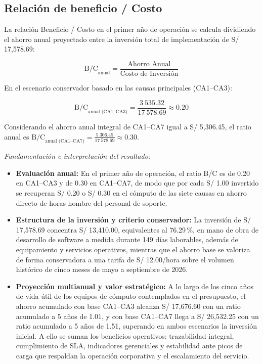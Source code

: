 \subsection{Relación de beneficio / Costo}

La relación Beneficio / Costo en el primer año de operación se calcula dividiendo el ahorro anual proyectado entre la inversión total de implementación de S/ 17,578.69:

\[
\text{B/C}_{\text{anual}} = \frac{\text{Ahorro Anual}}{\text{Costo de Inversión}}
\]

En el escenario conservador basado en las causas principales (CA1–CA3):

\[
\text{B/C}_{\text{anual (CA1–CA3)}} = \frac{3\ 535.32}{17\ 578.69} \approx 0.20
\]

Considerando el ahorro anual integral de CA1–CA7 igual a S/ 5,306.45, el ratio anual es $\text{B/C}_{\text{anual (CA1–CA7)}} = \frac{5\ 306.45}{17\ 578.69} \approx 0.30$.

\noindent\textit{Fundamentación e interpretación del resultado:}
\begin{itemize}[leftmargin=1.27cm]
    \item \textbf{Evaluación anual:} En el primer año de operación, el ratio B/C es de 0.20 en CA1–CA3 y de 0.30 en CA1–CA7, de modo que por cada S/ 1.00 invertido se recuperan S/ 0.20 o S/ 0.30 en el cómputo de las siete causas en ahorro directo de horas-hombre del personal de soporte.
    \item \textbf{Estructura de la inversión y criterio conservador:} La inversión de S/ 17,578.69 concentra S/ 13,410.00, equivalentes al 76.29\,\%, en mano de obra de desarrollo de software a medida durante 149 días laborables, además de equipamiento y servicios operativos, mientras que el ahorro base se valoriza de forma conservadora a una tarifa de S/ 12.00/hora sobre el volumen histórico de cinco meses de mayo a septiembre de 2026.
    \item \textbf{Proyección multianual y valor estratégico:} A lo largo de los cinco años de vida útil de los equipos de cómputo contemplados en el presupuesto, el ahorro acumulado con base CA1–CA3 alcanza S/ 17,676.60 con un ratio acumulado a 5 años de 1.01, y con base CA1–CA7 llega a S/ 26,532.25 con un ratio acumulado a 5 años de 1.51, superando en ambos escenarios la inversión inicial. A ello se suman los beneficios operativos: trazabilidad integral, cumplimiento de SLA, indicadores gerenciales y estabilidad ante picos de carga que respaldan la operación corporativa y el escalamiento del servicio.
\end{itemize}

